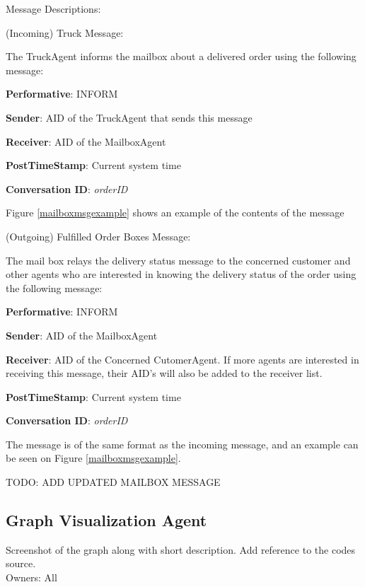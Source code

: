 \documentclass[11pt, a4paper]{article}
\begin{document}
\begin{enumerate}
	Message Descriptions:
	
	(Incoming) Truck Message:
	
	The TruckAgent informs the mailbox about a delivered order using the following message:
	
	\textbf{Performative}: INFORM
	
	\textbf{Sender}: AID of the TruckAgent that sends this message
	
	\textbf{Receiver}: AID of the MailboxAgent
	
	\textbf{PostTimeStamp}: Current system time
	
	\textbf{Conversation ID}: \textit{orderID}
	
	Figure \ref{mailboxmsgexample} shows an example of the contents of the message
	
	(Outgoing) Fulfilled Order Boxes Message:
	
	The mail box relays the delivery status message to the concerned customer and other agents who are interested in knowing the delivery status of the order using the following message:
	
	\textbf{Performative}: INFORM
	
	\textbf{Sender}: AID of the MailboxAgent
	
	\textbf{Receiver}: AID of the Concerned CutomerAgent. If more agents are interested in receiving this message, their AID's will also be added to the receiver list.
	
	\textbf{PostTimeStamp}: Current system time
	
	\textbf{Conversation ID}: \textit{orderID}
	
	The message is of the same format as the incoming message, and an example can be seen on Figure \ref{mailboxmsgexample}.
	
	TODO: ADD UPDATED MAILBOX MESSAGE
\end{enumerate}

\newpage
\subsection{Graph Visualization Agent}\label{GraphVisualizationAgent}
Screenshot of the graph along with short description. Add reference to the codes source. 
\\Owners: All
\end{document}
